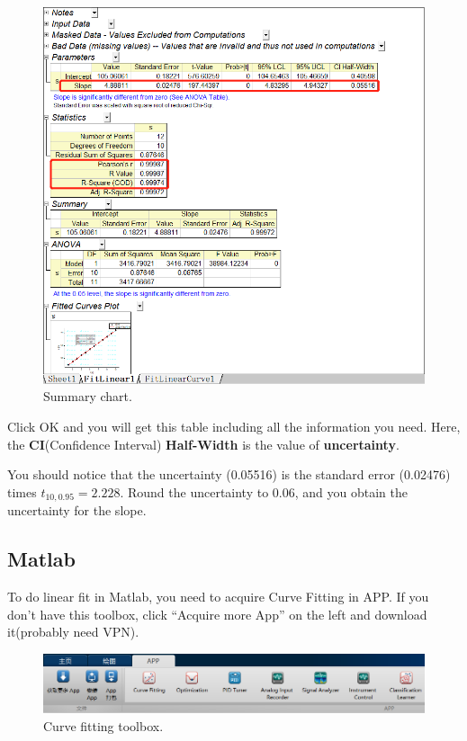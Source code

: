 \documentclass[12pt]{article}
\begin{document}
\begin{figure}[H]
\centering
\includegraphics[width=15cm]{o4.png}
\caption{Summary chart.}
\end{figure}

Click OK and you will get this table including all the information you need. Here, the \textbf{CI}(Confidence Interval) \textbf{Half-Width} is the value of \textbf{uncertainty}.

You should notice that the uncertainty (0.05516) is the standard error (0.02476) times $t_{10,0.95}=2.228$. Round the uncertainty to 0.06, and you obtain the uncertainty for the slope.

\newpage
\subsection{Matlab}

To do linear fit in \textsf{Matlab}, you need to acquire \textsf{Curve Fitting} in \textsf{APP}. If you don't have this toolbox, click ``Acquire more App'' on the left and download it(probably need VPN).

\begin{figure}[H]
\centering
\includegraphics[width=15cm]{m0.png}
\caption{Curve fitting toolbox.}
\end{figure}
\end{document}
